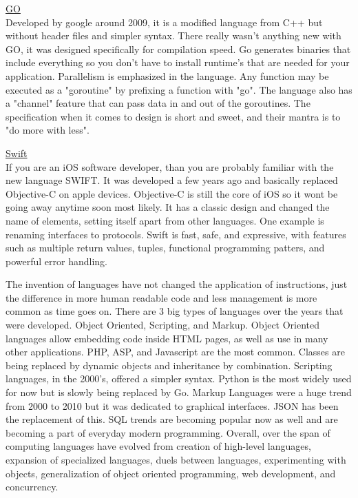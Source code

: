 \documentclass[letterpaper, 10 pt, conference]{IEEEtran}
\begin{document}
\noindent \underline{GO}\\
Developed by google around 2009, it is a modified language from C++ but without header files and simpler syntax. There really wasn't anything new with GO, it was designed specifically for compilation speed. Go generates binaries that include everything so you don't have to install runtime's that are needed for your application. Parallelism is emphasized in the language. Any function may be executed as a "goroutine" by prefixing a function with "go". The language also has a "channel" feature that can pass data in and out of the goroutines. The specification when it comes to design is short and sweet, and their mantra is to "do more with less".\bigskip

\noindent \underline{Swift}\\
If you are an iOS software developer, than you are probably familiar with the new language SWIFT. It was developed a few years ago and basically replaced Objective-C on apple devices. Objective-C is still the core of iOS so it wont be going away anytime soon most likely. It has a classic design and changed the name of elements, setting itself apart from other languages. One example is renaming interfaces to protocols. Swift is fast, safe, and expressive, with features such as multiple return values, tuples, functional programming patters, and powerful error handling.~\cite{History}
\bigskip

\indent The invention of languages have not changed the application of instructions, just the difference in more human readable code and less management is more common as time goes on. There are 3 big types of languages over the years that were developed. Object Oriented, Scripting, and Markup. Object Oriented languages allow embedding code inside HTML pages, as well as use in many other applications. PHP, ASP, and Javascript are the most common. Classes are being replaced by dynamic objects and inheritance by combination. Scripting languages, in the 2000's, offered a simpler syntax. Python is the most widely used for now but is slowly being replaced by Go. Markup Languages were a huge trend from 2000 to 2010 but it was dedicated to graphical interfaces. JSON has been the replacement of this. SQL trends are becoming popular now as well and are becoming a part of everyday modern programming.
\indent Overall, over the span of computing languages have evolved from creation of high-level languages, expansion of specialized languages, duels between languages, experimenting with objects, generalization of object oriented programming, web development, and concurrency. 
\end{document}
